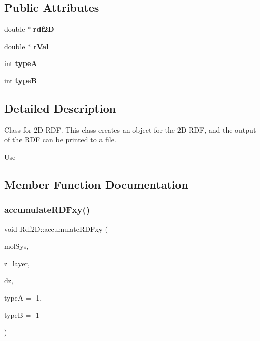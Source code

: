 \subsection*{Public Attributes}
\begin{DoxyCompactItemize}
\item 
\mbox{\label{classRdf2D_ad756caf75c389a69754105c70fb5db60}} 
double $\ast$ {\bfseries rdf2D}
\item 
\mbox{\label{classRdf2D_a3f7fdb2bb7ba36ff77f721c4abc8120a}} 
double $\ast$ {\bfseries r\+Val}
\item 
\mbox{\label{classRdf2D_a5720844aa069901d9e3b91a943af4ed8}} 
int {\bfseries typeA}
\item 
\mbox{\label{classRdf2D_ac4301eef0e368e8b67b6d03a152e0e8b}} 
int {\bfseries typeB}
\end{DoxyCompactItemize}


\subsection{Detailed Description}
Class for 2D R\+DF. This class creates an object for the 2D-\/\+R\+DF, and the output of the R\+DF can be printed to a file. 

Use 

\subsection{Member Function Documentation}
\mbox{\label{classRdf2D_a6c716851d80fd2a7dcfefd219892d87b}} 
\subsubsection{\texorpdfstring{accumulate\+R\+D\+Fxy()}{accumulateRDFxy()}}
{\footnotesize\ttfamily void Rdf2\+D\+::accumulate\+R\+D\+Fxy (\begin{DoxyParamCaption}\item[{class \mbox{\hyperlink{classCMolecularSystem}{C\+Molecular\+System}} \&}]{mol\+Sys,  }\item[{double}]{z\+\_\+layer,  }\item[{double}]{dz,  }\item[{int}]{typeA = {\ttfamily -\/1},  }\item[{int}]{typeB = {\ttfamily -\/1} }\end{DoxyParamCaption})}

